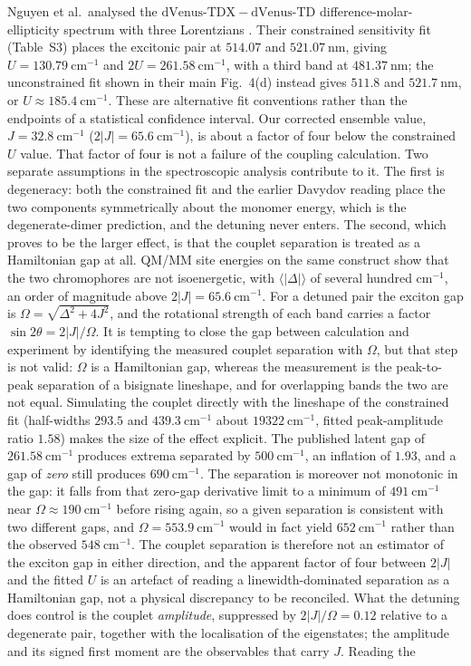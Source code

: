 \documentclass[journal=jpcbfk, manuscript=article, layout=twocolumn, doi=true]{achemso}
\begin{document}
\newpage
Nguyen et al.\ analysed the $\mathrm{dVenus\mbox{-}TDX}-\mathrm{dVenus\mbox{-}TD}$ difference-molar-ellipticity spectrum with three Lorentzians \cite{nguyen2025anomalous}. Their constrained sensitivity fit (Table~S3) places the excitonic pair at $514.07$ and $521.07~\mathrm{nm}$, giving $U=130.79~\mathrm{cm^{-1}}$ and $2U=261.58~\mathrm{cm^{-1}}$, with a third band at $481.37~\mathrm{nm}$; the unconstrained fit shown in their main Fig.~4(d) instead gives $511.8$ and $521.7~\mathrm{nm}$, or $U\approx185.4~\mathrm{cm^{-1}}$. These are alternative fit conventions rather than the endpoints of a statistical confidence interval. Our corrected ensemble value, $J=32.8~\mathrm{cm^{-1}}$ ($2|J|=65.6~\mathrm{cm^{-1}}$), is about a factor of four below the constrained $U$ value. That factor of four is not a failure of the coupling calculation. Two separate assumptions in the spectroscopic analysis contribute to it. The first is degeneracy: both the constrained fit and the earlier Davydov reading place the two components symmetrically about the monomer energy, which is the degenerate-dimer prediction, and the detuning never enters. The second, which proves to be the larger effect, is that the couplet separation is treated as a Hamiltonian gap at all. QM/MM site energies on the same construct show that the two chromophores are not isoenergetic, with $\langle|\Delta|\rangle$ of several hundred $\mathrm{cm^{-1}}$, an order of magnitude above $2|J|=65.6~\mathrm{cm^{-1}}$. For a detuned pair the exciton gap is $\Omega=\sqrt{\Delta^{2}+4J^{2}}$, and the rotational strength of each band carries a factor $\sin2\theta=2|J|/\Omega$. It is tempting to close the gap between calculation and experiment by identifying the measured couplet separation with $\Omega$, but that step is not valid: $\Omega$ is a Hamiltonian gap, whereas the measurement is the peak-to-peak separation of a bisignate lineshape, and for overlapping bands the two are not equal. Simulating the couplet directly with the lineshape of the constrained fit (half-widths $293.5$ and $439.3~\mathrm{cm^{-1}}$ about $19322~\mathrm{cm^{-1}}$, fitted peak-amplitude ratio $1.58$) makes the size of the effect explicit. The published latent gap of $261.58~\mathrm{cm^{-1}}$ produces extrema separated by $500~\mathrm{cm^{-1}}$, an inflation of $1.93$, and a gap of \emph{zero} still produces $690~\mathrm{cm^{-1}}$. The separation is moreover not monotonic in the gap: it falls from that zero-gap derivative limit to a minimum of $491~\mathrm{cm^{-1}}$ near $\Omega\approx190~\mathrm{cm^{-1}}$ before rising again, so a given separation is consistent with two different gaps, and $\Omega=553.9~\mathrm{cm^{-1}}$ would in fact yield $652~\mathrm{cm^{-1}}$ rather than the observed $548~\mathrm{cm^{-1}}$. The couplet separation is therefore not an estimator of the exciton gap in either direction, and the apparent factor of four between $2|J|$ and the fitted $U$ is an artefact of reading a linewidth-dominated separation as a Hamiltonian gap, not a physical discrepancy to be reconciled. What the detuning does control is the couplet \emph{amplitude}, suppressed by $2|J|/\Omega=0.12$ relative to a degenerate pair, together with the localisation of the eigenstates; the amplitude and its signed first moment are the observables that carry $J$. Reading the 
\end{document}
